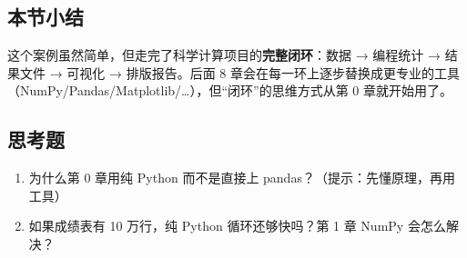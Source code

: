 \subsection{本节小结}\label{ux672cux8282ux5c0fux7ed3-2}

这个案例虽然简单，但走完了科学计算项目的\textbf{完整闭环}：数据 →
编程统计 → 结果文件 → 可视化 → 排版报告。后面 8
章会在每一环上逐步替换成更专业的工具（NumPy/Pandas/Matplotlib/\ldots），但``闭环''的思维方式从第
0 章就开始用了。

\subsection{思考题}\label{ux601dux8003ux9898-2}

\begin{enumerate}
\def\labelenumi{\arabic{enumi}.}
\tightlist
\item
  为什么第 0 章用纯 Python 而不是直接上
  pandas？（提示：先懂原理，再用工具）
\item
  如果成绩表有 10 万行，纯 Python 循环还够快吗？第 1 章 NumPy
  会怎么解决？
\end{enumerate}

\newpage

